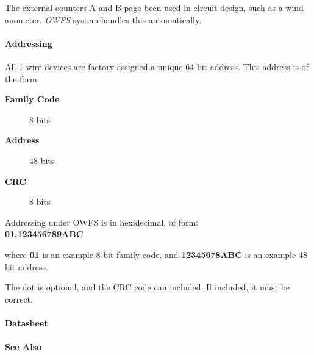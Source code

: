 The external counters A and
B page been used in circuit design, such as a wind anometer. \textit{OWFS} system
handles this automatically. 
\paragraph*{Addressing}
          All 1-wire devices are factory
assigned a unique 64-bit address. This address is of the form: \begin{description}
\item [\textbf{Family Code}
] 8 bits 
\item [\textbf{Address} ] 48 bits 
\item [\textbf{CRC} ] 8 bits 
\end{description}


\begin{description}
\item [Addressing under OWFS is in hexidecimal,
of form: ] 
\item [\textbf{01.123456789ABC} ] 
\end{description}


where \textbf{01} is an example 8-bit family code, and \textbf{12345678ABC}
is an example 48 bit address. 

The dot is optional, and the CRC code can
included. If included, it must be correct.  
\paragraph*{Datasheet}


\paragraph*{See Also}

